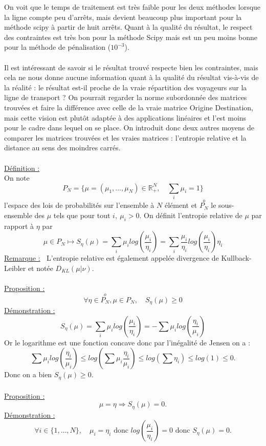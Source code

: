 \documentclass[12pt]{article}
\newcommand{\R}{\mathbb{R}}
\newcommand{\defin}{\underline{Définition :} }
\newcommand{\rmq}{\underline{Remarque :} }
\newcommand{\prop}{\underline{Proposition :} }
\newcommand{\demo}{\underline{Démonstration :} }
\begin{document}
On voit que le temps de traitement est très faible pour les deux méthodes lorsque la ligne compte peu d'arrêts, mais devient beaucoup plus important pour la méthode scipy à partir de huit arrêts. Quant à la qualité du résultat, le respect des contraintes est très bon pour la méthode Scipy mais est un peu moins bonne pour la méthode de pénalisation ($10^{-3}$). \\
\\
Il est intéressant de savoir si le résultat trouvé respecte bien les contraintes, mais cela ne nous donne aucune information quant à la qualité du résultat vis-à-vis de la réalité : le résultat est-il proche de la vraie répartition des voyageurs sur la ligne de transport ? On pourrait regarder la norme subordonnée des matrices trouvées et faire la différence avec celle de la vraie matrice Origine Destination, mais cette vision est plutôt adaptée à des applications linéaires et l'est moins pour le cadre dans lequel on se place. On introduit donc deux autres moyens de comparer les matrices trouvées et  les vraies matrices : l'entropie relative et la distance au sens des moindres carrés.\\
\\
\defin\\
On note
\[
P_N = \{ \mu = (\mu_1, \dots, \mu_N) \in \R^N_+, \quad \sum_i \mu_i =1 \}
\]
l'espace des lois de probabilités sur l'ensemble à $N$ élément et $\overset{o}{P_N}$ le sous-ensemble des $\mu$ tels que pour tout $i,\: \mu_i > 0$. On définit l'entropie relative de $\mu$ par rapport à $\eta$ par 
\[
\mu \in P_N \mapsto S_\eta(\mu) = \sum_i \mu_ilog(\frac{\mu_i}{\eta_i}) = \sum_i \frac{\mu_i}{\eta_i}log(\frac{\mu_i}{\eta_i})\eta_i
\]
\rmq $\:$ L'entropie relative est également appelée divergence de Kullback-Leibler et notée $D_{KL}(\mu | \nu)$.\\
\\
\prop
\[
\forall \eta \in \overset{o}{P_N}, \mu \in P_N, \quad S_\eta(\mu) \geq 0
\]
\demo
\[
S_\eta(\mu) = \sum_i \mu_ilog(\frac{\mu_i}{\eta_i}) = -\sum \mu_ilog(\frac{\eta_i}{\mu_i})
\]
Or le logarithme est une fonction concave donc par l'inégalité de Jensen on a :
\[
\sum \mu_ilog(\frac{\eta_i}{\mu_i}) \leq log(\sum\mu_i \frac{\eta_i}{\mu_i}) \leq log(\sum \eta_i) \leq log(1) \leq 0.
\]
Donc on a bien $S_\eta(\mu) \geq 0.$\\
\\
\prop
\[
\mu = \eta \Rightarrow S_\eta(\mu) = 0.
\]
\demo
\[\forall i \in \{1,\dots,N\}, \quad \mu_i = \eta_i \text{ donc } log(\frac{\mu_i}{\eta_i}) = 0 \text{ donc } S_\eta(\mu) = 0.
\]
\end{document}
